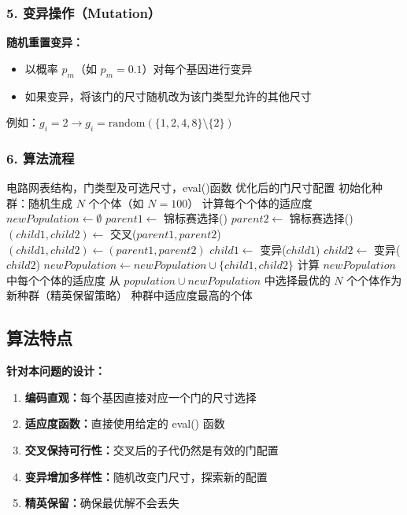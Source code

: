 \documentclass[UTF8,12pt,a4paper]{ctexart}
\begin{document}
\subsubsection*{5. 变异操作（Mutation）}

\textbf{随机重置变异：}
\begin{itemize}
	\item 以概率 $p_m$（如 $p_m = 0.1$）对每个基因进行变异
	\item 如果变异，将该门的尺寸随机改为该门类型允许的其他尺寸
\end{itemize}

例如：$g_i = 2 \rightarrow g_i = \text{random}(\{1, 2, 4, 8\} \setminus \{2\})$

\subsubsection*{6. 算法流程}

\begin{algorithm}[H]
	\caption{遗传算法优化门尺寸}
	\begin{algorithmic}[1]
		\Require 电路网表结构，门类型及可选尺寸，eval()函数
		\Ensure 优化后的门尺寸配置
		\State 初始化种群：随机生成 $N$ 个个体（如 $N = 100$）
		\State 计算每个个体的适应度
			\State $newPopulation \gets \emptyset$
			 
				\State $parent1 \gets$ 锦标赛选择()
				\State $parent2 \gets$ 锦标赛选择()
				 
					\State $(child1, child2) \gets$ 交叉($parent1, parent2$)
				\Else
					\State $(child1, child2) \gets (parent1, parent2)$
				\EndIf
				\State $child1 \gets$ 变异($child1$)
				\State $child2 \gets$ 变异($child2$)
				\State $newPopulation \gets newPopulation \cup \{child1, child2\}$
			\EndFor
			\State 计算 $newPopulation$ 中每个个体的适应度
			\State 从 $population \cup newPopulation$ 中选择最优的 $N$ 个个体作为新种群（精英保留策略）
		\EndFor
		\State \Return 种群中适应度最高的个体
	\end{algorithmic}
\end{algorithm}

\subsection*{算法特点}

\textbf{针对本问题的设计：}
\begin{enumerate}
	\item \textbf{编码直观：}每个基因直接对应一个门的尺寸选择
	\item \textbf{适应度函数：}直接使用给定的 eval() 函数
	\item \textbf{交叉保持可行性：}交叉后的子代仍然是有效的门配置
	\item \textbf{变异增加多样性：}随机改变门尺寸，探索新的配置
	\item \textbf{精英保留：}确保最优解不会丢失
\end{enumerate}
\end{document}
